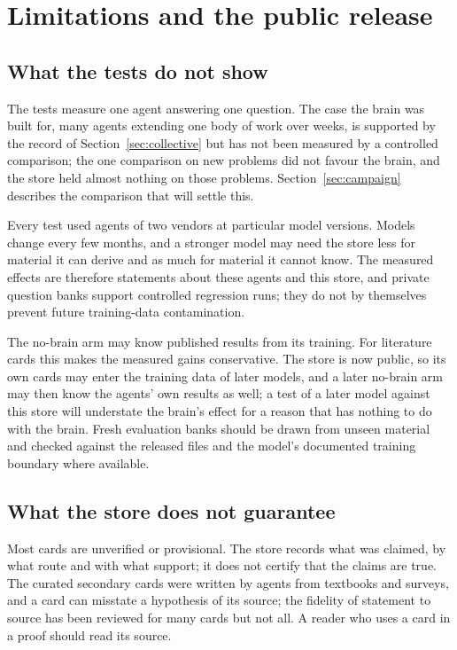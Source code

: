 \section{Limitations and the public release}\label{sec:limits}

\subsection{What the tests do not show}
The tests measure one agent answering one question. The case the brain was built for, many agents extending one body of work over weeks, is supported by the record of Section~\ref{sec:collective} but has not been measured by a controlled comparison; the one comparison on new problems did not favour the brain, and the store held almost nothing on those problems. Section~\ref{sec:campaign} describes the comparison that will settle this.

Every test used agents of two vendors at particular model versions. Models change every few months, and a stronger model may need the store less for material it can derive and as much for material it cannot know. The measured effects are therefore statements about these agents and this store, and private question banks support controlled regression runs; they do not by themselves prevent future training-data contamination.

The no-brain arm may know published results from its training. For literature cards this makes the measured gains conservative. The store is now public, so its own cards may enter the training data of later models, and a later no-brain arm may then know the agents' own results as well; a test of a later model against this store will understate the brain's effect for a reason that has nothing to do with the brain. Fresh evaluation banks should be drawn from unseen material and checked against the released files and the model's documented training boundary where available.

\subsection{What the store does not guarantee}
Most cards are \textsf{unverified} or \textsf{provisional}. The store records what was claimed, by what route and with what support; it does not certify that the claims are true. The curated secondary cards were written by agents from textbooks and surveys, and a card can misstate a hypothesis of its source; the fidelity of statement to source has been reviewed for many cards but not all. A reader who uses a card in a proof should read its source.

